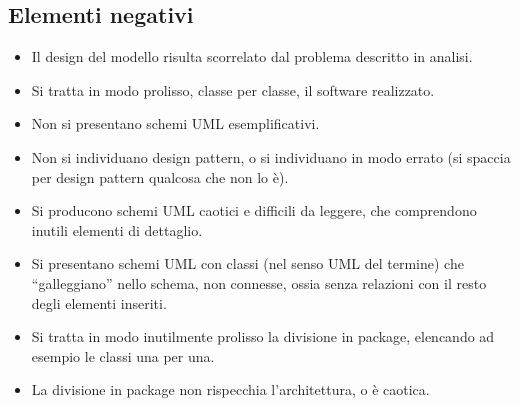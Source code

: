 \documentclass[a4paper,12pt]{report}
\begin{document}
\subsection*{Elementi negativi}
\begin{itemize}
	\item Il design del modello risulta scorrelato dal problema descritto in analisi.
	\item Si tratta in modo prolisso, classe per classe, il software realizzato.
	\item Non si presentano schemi UML esemplificativi.
	\item Non si individuano design pattern, o si individuano in modo errato (si spaccia per design pattern qualcosa che non lo è).
	\item Si producono schemi UML caotici e difficili da leggere, che comprendono inutili elementi di dettaglio.
	\item Si presentano schemi UML con classi (nel senso UML del termine) che ``galleggiano'' nello schema, non connesse, ossia senza relazioni con il resto degli elementi inseriti.
	\item Si tratta in modo inutilmente prolisso la divisione in package, elencando ad esempio le classi una per una.
	\item La divisione in package non rispecchia l'architettura, o è caotica.
\end{itemize}

\end{document}
